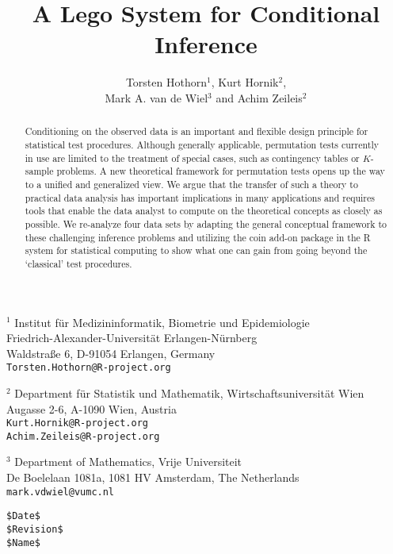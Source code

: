 \documentclass{article}
\newcommand{\Rpackage}[1]{{\normalfont\fontseries{b}\selectfont #1}}
\newcommand{\RR}{\textsf{R}}
\begin{document}
\title{A Lego System for Conditional Inference}

\author{Torsten Hothorn$^1$, Kurt Hornik$^2$, \\ 
            Mark A. van de Wiel$^3$ and Achim Zeileis$^2$}

\date{}

\maketitle

\thispagestyle{empty}

\noindent$^1$ Institut f\"ur Medizininformatik, Biometrie und Epidemiologie\\
           Friedrich-Alexander-Universit\"at Erlangen-N\"urnberg\\
           Waldstra{\ss}e 6, D-91054 Erlangen, Germany \\
           \texttt{Torsten.Hothorn@R-project.org}
         \newline

         \noindent$^2$ Department f\"ur Statistik und Mathematik,
            Wirtschaftsuniversit\"at Wien \\
            Augasse 2-6, A-1090 Wien, Austria \\
            \texttt{Kurt.Hornik@R-project.org} \\
            \texttt{Achim.Zeileis@R-project.org}
         \newline

         \noindent$^3$ Department of Mathematics, Vrije Universiteit \\
                        De Boelelaan 1081a, 1081 HV Amsterdam, The Netherlands \\
            \texttt{mark.vdwiel@vumc.nl}
         \newline
\noindent
\begin{verbatim}
$Date$ 
$Revision$ 
$Name$
\end{verbatim}


\begin{abstract}
Conditioning on the observed data is an important and flexible 
design principle for statistical test procedures. Although generally
applicable, permutation tests currently in use are limited to 
the treatment of special cases, such as contingency tables or $K$-sample
problems. A new theoretical framework for permutation
tests opens up the way to a unified and generalized view. We argue that the
transfer of such a theory to practical data analysis has important
implications in many applications and requires tools that enable the
data analyst to compute on the theoretical concepts as closely as possible.
We re-analyze four data sets
by adapting the general conceptual framework to these challenging inference
problems and
utilizing the \Rpackage{coin} add-on package in the \RR{} system for statistical computing
to show what one can gain from going beyond the `classical' test procedures.
\end{abstract}
\end{document}
